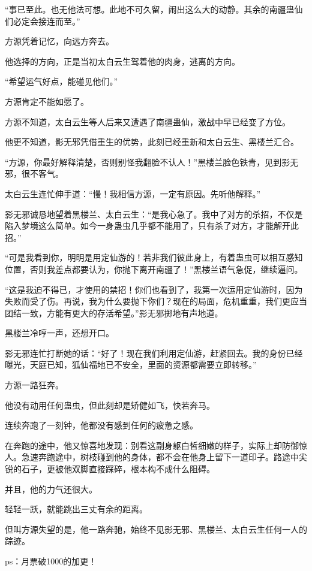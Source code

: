 \begin{this_body}
“事已至此。也无他法可想。此地不可久留，闹出这么大的动静。其余的南疆蛊仙们必定会接连而至。”

方源凭着记忆，向远方奔去。

他选择的方向，正是当初太白云生驾着他的肉身，逃离的方向。

“希望运气好点，能碰见他们。”

方源肯定不能如愿了。

方源不知道，太白云生等人后来又遭遇了南疆蛊仙，激战中早已经变了方位。

他更不知道，影无邪凭借重生的优势，此刻已经重新和太白云生、黑楼兰汇合。

“方源，你最好解释清楚，否则别怪我翻脸不认人！”黑楼兰脸色铁青，见到影无邪，很不客气。

太白云生连忙伸手道：“慢！我相信方源，一定有原因。先听他解释。”

影无邪诚恳地望着黑楼兰、太白云生：“是我心急了。我中了对方的杀招，不仅是陷入梦境这么简单。如今一身蛊虫几乎都不能用了，只有杀了对方，才能解开此招。”

“可是我看到你，明明是用定仙游的！若非我们彼此身上，有着蛊虫可以相互感知位置，否则我差点都要认为，你抛下离开南疆了！”黑楼兰语气急促，继续逼问。

“这是我迫不得已，才使用的禁招！你们也看到了，我第一次运用定仙游时，因为失败而受了伤。再说，我为什么要抛下你们？现在的局面，危机重重，我们更应当团结一致，方能有更大的存活希望。”影无邪掷地有声地道。

黑楼兰冷哼一声，还想开口。

影无邪连忙打断她的话：“好了！现在我们利用定仙游，赶紧回去。我的身份已经曝光，天庭已知，狐仙福地已不安全，里面的资源都需要立即转移。”

方源一路狂奔。

他没有动用任何蛊虫，但此刻却是矫健如飞，快若奔马。

连续奔跑了一刻钟，他都没有感到任何的疲惫之感。

在奔跑的途中，他又惊喜地发现：别看这副身躯白皙细嫩的样子，实际上却防御惊人。急速奔跑途中，树枝碰到他的身体，都不会在他身上留下一道印子。路途中尖锐的石子，更被他双脚直接踩碎，根本构不成什么阻碍。

并且，他的力气还很大。

轻轻一跃，就能跳出三丈有余的距离。

但叫方源失望的是，他一路奔驰，始终不见影无邪、黑楼兰、太白云生任何一人的踪迹。

ps：月票破1000的加更！

\end{this_body}

